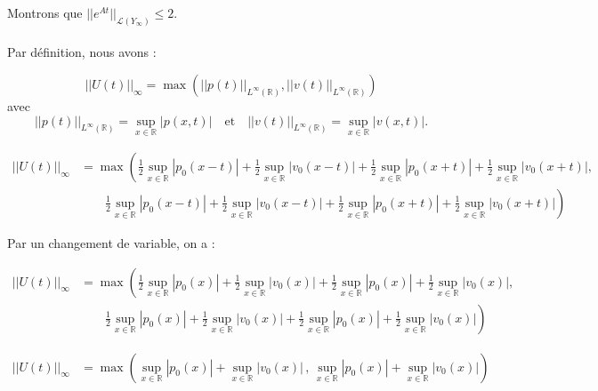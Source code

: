 \documentclass[a4paper,11pt]{article}
\begin{document}
Montrons que $||e^{At}||_{\mathcal{L}(Y_{\infty})} \leq 2$.\\ \\
Par d\'efinition, nous avons :

\begin{displaymath}
    ||U(t)||_{\infty}=\max \left( ||p(t)||_{L^{\infty}(\mathbb{R})},||v(t)||_{L^{\infty}(\mathbb{R})} \right)
\end{displaymath}
avec
\begin{displaymath}
    ||p(t)||_{L^{\infty}(\mathbb{R})}=\sup_{x\in \mathbb{R}}|p(x,t)| \quad \mbox{et} \quad ||v(t)||_{L^{\infty}(\mathbb{R})}=\sup_{x\in \mathbb{R}}|v(x,t)|.
\end{displaymath}

\begin{displaymath}
    \begin{split}
        ||U(t)||_{\infty} &= \max \left( \frac{1}{2}\sup_{x \in \mathbb{R}}|p_0(x-t)| + \frac{1}{2}\sup_{x \in \mathbb{R}} |v_0(x-t)| + \frac{1}{2}\sup_{x \in \mathbb{R}}|p_0(x+t)| + \frac{1}{2}\sup_{x \in \mathbb{R}}|v_0(x+t)| \right. , \\
        & \qquad \left. \frac{1}{2}\sup_{x \in \mathbb{R}}|p_0(x-t)| + \frac{1}{2}\sup_{x \in \mathbb{R}}|v_0(x-t)| + \frac{1}{2}\sup_{x \in \mathbb{R}}|p_0(x+t)| + \frac{1}{2}\sup_{x \in \mathbb{R}}|v_0(x+t)| \right)
    \end{split}
\end{displaymath}


Par un changement de variable, on a :

\begin{displaymath}
    \begin{split}
        ||U(t)||_{\infty} &= \max \left( \frac{1}{2}\sup_{x \in \mathbb{R}}|p_0(x)| + \frac{1}{2}\sup_{x \in \mathbb{R}} |v_0(x)| + \frac{1}{2}\sup_{x \in \mathbb{R}}|p_0(x)| + \frac{1}{2}\sup_{x \in \mathbb{R}}|v_0(x)| \right. , \\
        & \qquad \left. \frac{1}{2}\sup_{x \in \mathbb{R}}|p_0(x)| + \frac{1}{2}\sup_{x \in \mathbb{R}}|v_0(x)| + \frac{1}{2}\sup_{x \in \mathbb{R}}|p_0(x)| + \frac{1}{2}\sup_{x \in \mathbb{R}}|v_0(x)| \right)
    \end{split}
\end{displaymath}

\begin{displaymath}
    \begin{split}
        ||U(t)||_{\infty} &= \max \left( \sup_{x \in \mathbb{R}}|p_0(x)| + \sup_{x \in \mathbb{R}} |v_0(x)| \, , \,
        \sup_{x \in \mathbb{R}}|p_0(x)| + \sup_{x \in \mathbb{R}}|v_0(x)| \right)
    \end{split}
\end{displaymath}
\end{document}
